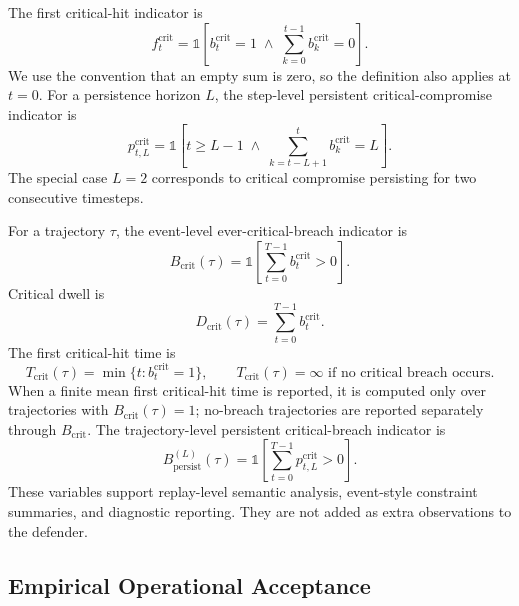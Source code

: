 \documentclass[sigconf,review,anonymous]{acmart}
\begin{document}
The first critical-hit indicator is
\begin{equation}
 f_t^{\mathrm{crit}}
 =
 \mathbb{1}\!\left[
 b_t^{\mathrm{crit}}=1
 \;\wedge\;
 \sum_{k=0}^{t-1} b_k^{\mathrm{crit}}=0
 \right].
 \label{eq:app-first-critical}
\end{equation}
We use the convention that an empty sum is zero, so the definition also
applies at \(t=0\). For a persistence horizon \(L\), the step-level
persistent critical-compromise indicator is
\begin{equation}
 p_{t,L}^{\mathrm{crit}}
 =
 \mathbb{1}\!\left[
 t\geq L-1
 \;\wedge\;
 \sum_{k=t-L+1}^{t} b_k^{\mathrm{crit}}=L
 \right].
 \label{eq:app-persistent-step}
\end{equation}
The special case \(L=2\) corresponds to critical compromise persisting
for two consecutive timesteps.

For a trajectory \(\tau\), the event-level ever-critical-breach
indicator is
\begin{equation}
 B_{\mathrm{crit}}(\tau)
 =
 \mathbb{1}\!\left[
 \sum_{t=0}^{T-1} b_t^{\mathrm{crit}}>0
 \right].
 \label{eq:app-ever-critical}
\end{equation}
Critical dwell is
\begin{equation}
 D_{\mathrm{crit}}(\tau)
 =
 \sum_{t=0}^{T-1} b_t^{\mathrm{crit}}.
 \label{eq:app-critical-dwell}
\end{equation}
The first critical-hit time is
\begin{equation}
 T_{\mathrm{crit}}(\tau)
 =
 \min\{t:b_t^{\mathrm{crit}}=1\},
 \qquad
 T_{\mathrm{crit}}(\tau)=\infty
 \text{ if no critical breach occurs}.
 \label{eq:app-first-critical-time}
\end{equation}
When a finite mean first critical-hit time is reported, it is computed
only over trajectories with \(B_{\mathrm{crit}}(\tau)=1\); no-breach
trajectories are reported separately through \(B_{\mathrm{crit}}\). The
trajectory-level persistent critical-breach indicator is
\begin{equation}
 B_{\mathrm{persist}}^{(L)}(\tau)
 =
 \mathbb{1}\!\left[
 \sum_{t=0}^{T-1} p_{t,L}^{\mathrm{crit}}>0
 \right].
 \label{eq:app-persistent-trajectory}
\end{equation}
These variables support replay-level semantic analysis, event-style
constraint summaries, and diagnostic reporting. They are not added as
extra observations to the defender.

\subsection{Empirical Operational Acceptance}
\label{app:empirical-acceptance}
\end{document}
